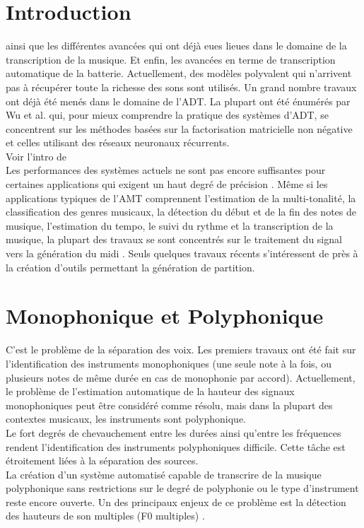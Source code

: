 \section*{Introduction}
 ainsi que les différentes avancées qui ont déjà eues lieues dans le domaine de la transcription de la musique. Et enfin, les avancées en terme de transcription automatique de la batterie. Actuellement, des modèles polyvalent qui n’arrivent pas à récupérer toute la richesse des sons sont utilisés.
Un grand nombre travaux ont déjà été menés dans le domaine de l’ADT. La plupart ont été énumérés par Wu et al. \cite{8350302} qui, pour mieux comprendre la pratique des systèmes d’ADT, se concentrent sur les méthodes basées sur la factorisation matricielle non négative et celles utilisant des réseaux neuronaux récurrents.\\
Voir l’intro de \cite{article1}\\
Les performances des systèmes actuels ne sont pas encore suffisantes pour certaines applications qui exigent un haut degré de précision \cite{article1}. Même si les applications typiques de l'AMT comprennent l'estimation de la multi-tonalité, la classification des genres musicaux, la détection du début et de la fin des notes de musique, l'estimation du tempo, le suivi du rythme et la transcription de la musique, la plupart des travaux se sont concentrés sur le traitement du signal vers la génération du midi \cite{article2}. Seuls quelques travaux récents \cite{foscarin:hal-01988990} s’intéressent de près à la création d’outils permettant la génération de partition.

\section{Monophonique et Polyphonique}
C’est le problème de la séparation des voix.
Les premiers travaux ont été fait sur l’identification des instruments monophoniques (une seule note à la fois, ou plusieurs notes de même durée en cas de monophonie par accord). Actuellement, le problème de l'estimation automatique de la hauteur des signaux monophoniques peut être considéré comme résolu, mais dans la plupart des contextes musicaux, les instruments sont polyphonique.\\
Le fort degrés de chevauchement entre les durées ainsi qu’entre les fréquences rendent l’identification des instruments polyphoniques difficile. Cette tâche est étroitement liées à la séparation des sources.\\
La création d'un système automatisé capable de transcrire de la musique polyphonique sans restrictions sur le degré de polyphonie ou le type d'instrument reste encore ouverte. Un des principaux enjeux de ce problème est la détection des hauteurs de son multiples (F0 multiples) \cite{article1}.
